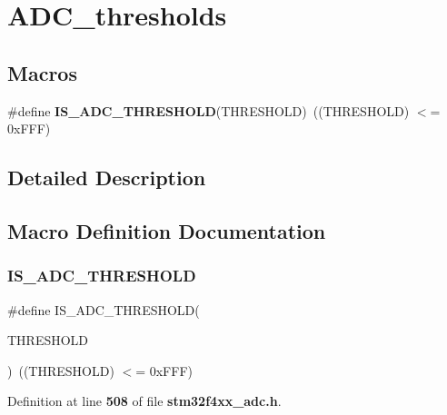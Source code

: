 \section{A\+D\+C\+\_\+thresholds}
\label{group__ADC__thresholds}
\subsection*{Macros}
\begin{DoxyCompactItemize}
\item 
\#define \textbf{ I\+S\+\_\+\+A\+D\+C\+\_\+\+T\+H\+R\+E\+S\+H\+O\+LD}(T\+H\+R\+E\+S\+H\+O\+LD)~((T\+H\+R\+E\+S\+H\+O\+LD) $<$= 0x\+F\+F\+F)
\end{DoxyCompactItemize}


\subsection{Detailed Description}


\subsection{Macro Definition Documentation}
\mbox{\label{group__ADC__thresholds_gaa71cdff6dafddfccff8a7e88768bfb54}} 
\subsubsection{I\+S\+\_\+\+A\+D\+C\+\_\+\+T\+H\+R\+E\+S\+H\+O\+LD}
{\footnotesize\ttfamily \#define I\+S\+\_\+\+A\+D\+C\+\_\+\+T\+H\+R\+E\+S\+H\+O\+LD(\begin{DoxyParamCaption}\item[{}]{T\+H\+R\+E\+S\+H\+O\+LD }\end{DoxyParamCaption})~((T\+H\+R\+E\+S\+H\+O\+LD) $<$= 0x\+F\+F\+F)}



Definition at line \textbf{ 508} of file \textbf{ stm32f4xx\+\_\+adc.\+h}.

